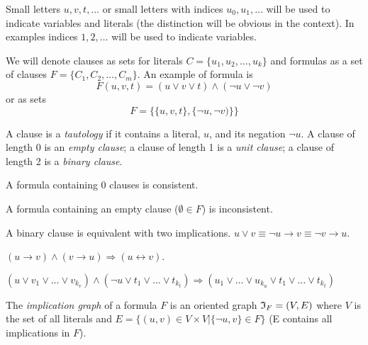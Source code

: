 Small letters $u, v, t, \ldots$ or small letters with indices $u_0,
u_1, \ldots$ will be used to indicate variables and literals (the
distinction will be obvious in the context). In examples
indices $1, 2, \ldots$ will be used to indicate variables.

We will denote clauses as sets for literals $C = \{ u_1, u_2, \ldots,
u_k \}$ and formulas as a set of clauses $F = \{ C_1, C_2, \ldots,
C_m \} $.  An example of formula is
\[
F(u, v, t) = (u \lor v \lor t) \land (\neg u \lor \neg v)
\]
or as sets
\[
F = \{ \{u, v, t\}, \{\neg u, \neg v)\}\}
\]

\begin{mydef}
  A clause is a \emph{tautology} if it contains a literal, $u$, and its negation
  $\neg u$. A clause of length 0 is an \emph{empty clause}; a clause of length 1
  is a \emph{unit clause}; a clause of length 2 is a \emph{binary clause}. 
\end{mydef}

\begin{myprop}
  A formula containing 0 clauses is consistent.
\end{myprop}

\begin{myprop}
  A formula containing an empty clause ($\emptyset \in F$) is inconsistent.
\end{myprop}

\begin{myprop}
  A binary clause is equivalent with two implications.
  $u \lor v \equiv \neg u \rightarrow v \equiv \neg v \rightarrow u$.
\end{myprop}

\begin{myprop}
  \label{myprop:equivalent-literals}
  $(u \rightarrow v) \land (v \rightarrow u) \Rightarrow (u \leftrightarrow v)$.
\end{myprop}

\begin{mydef}[Resolution]
  \label{mydef:resolution}
  $(u \lor v_1 \lor \ldots \lor v_{k_v})
  \land (\neg u \lor t_1 \lor \ldots \lor t_{k_t})
  \Rightarrow (u_1 \lor \ldots \lor u_{k_u} \lor t_1 \lor \ldots \lor t_{k_t})$
\end{mydef}

\begin{mydef}
  The \emph{implication graph} of a formula $F$ is an oriented graph
  $\mathfrak{I}_F = (V, E)$ where $V$ is the set of all literals and $E = \{(u,
  v) \in V \times V | \{\neg u, v\} \in F\}$ (E contains all implications in $F$).
\end{mydef}

